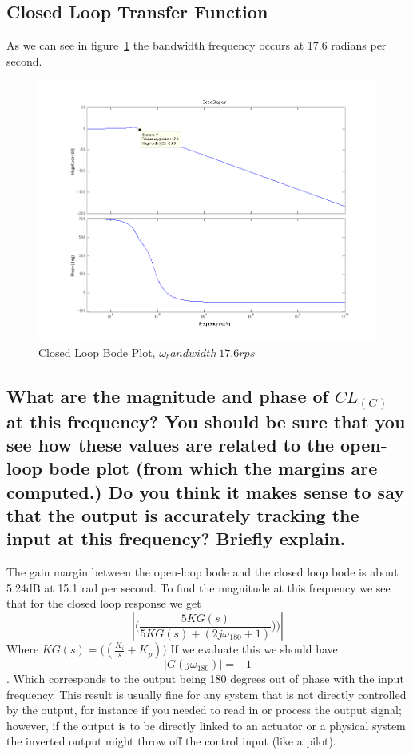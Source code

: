 \documentclass[english]{article}
\begin{document}
\subsection*{Closed Loop Transfer Function}
\FloatBarrier
As we can see in figure~\ref{fig:2_b} the bandwidth frequency occurs at 17.6 radians per second.
\begin{figure}[!ht]
\includegraphics[width = \linewidth]{2b.png}
\caption{Closed Loop Bode Plot, $\omega_bandwidth~ 17.6 rps$}
\label{fig:2_b}
\end{figure}
\FloatBarrier 

\subsection*{What are the magnitude and phase of $CL_{(G)}$ at this frequency? You should be sure that
you see how these values are related to the open-loop bode plot (from which the margins are
computed.) Do you think it makes sense to say that the output is accurately tracking the input at this
frequency? Briefly explain.}
The gain margin between the open-loop bode and the closed loop bode is about 5.24dB at 15.1 rad per second. To find the magnitude at this frequency we see that for the closed loop response we get 
$$
  |  \big( \frac{5KG(s)}{5KG(s) + (2j\omega_{180} + 1)  })\big) | 
$$
Where $KG(s) = \big( (\frac{K_i}{s} + K_p )\big)$
If we evaluate this we should have $$|G(j\omega_{180})| = -1 $$. Which corresponds to the output being 180 degrees out of phase with the input frequency. This result is usually fine for any system that is not directly controlled by the output, for instance if you needed to  read in or process the output signal; however, if the output is to be directly linked to an actuator or a physical system the inverted output might throw off the control input (like a pilot). 
\end{document}
